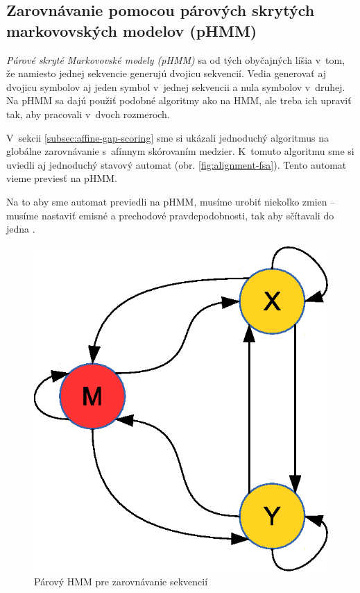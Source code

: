 

\subsection{Zarovnávanie pomocou párových skrytých markovovských modelov (pHMM)}
\label{subsec:hmm-alignment}

\textit{Párové skryté Markovovské modely (pHMM)} sa od tých obyčajných líšia v~tom, že namiesto jednej sekvencie generujú dvojicu sekvencií. Vedia generovať aj dvojicu symbolov aj jeden symbol v~jednej sekvencii a nula symbolov v~druhej. Na pHMM sa dajú použiť podobné algoritmy ako na HMM, ale treba ich upraviť tak, aby pracovali v~dvoch rozmeroch.

V~sekcii \ref{subsec:affine-gap-scoring} sme si ukázali jednoduchý algoritmus na globálne zarovnávanie s~afínnym skórovaním medzier. K~tomuto algoritmu sme si uviedli aj jednoduchý stavový automat (obr. \ref{fig:alignment-fsa}). Tento automat vieme previesť na pHMM.

Na to aby sme automat previedli na pHMM, musíme urobiť niekoľko zmien -- musíme nastaviť emisné a prechodové pravdepodobnosti, tak aby sčítavali do jedna \cite{durbin}.

\begin{figure}[htp]
    \centering
    \includegraphics[width=.4\textwidth]{images/simple_model}
    \caption{Párový HMM pre zarovnávanie sekvencií}
    \label{fig:simple-model}
\end{figure}

